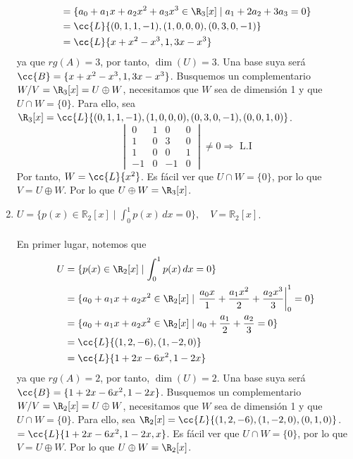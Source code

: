 \begin{ejercicio}
\begin{enumerate}[label=\alph*)]
\begin{align*}
            &= \{ a_0 + a_1 x + a_2 x^2 + a_3 x^3 \in \R_3[x] \mid a_1 + 2a_2 + 3a_3 = 0 \} \\
            &= \cc{L} \{ (0, 1, 1, -1), (1, 0, 0, 0), (0, 3,0, -1) \} \\
            &= \cc{L} \{ x + x^2 - x^3, 1, 3x - x^3 \} 
        \end{align*}
        ya que $rg(A) = 3$, por tanto, $\dim(U) = 3$. Una base suya será $\cc{B} = \{ x + x^2 - x^3, 1, 3x - x^3 \}$.
        Busquemos un complementario $W / V = \R_3[x] = U \oplus W$, necesitamos que $W$ sea de dimensión 1 y que $U \cap W = \{0\}$.
        Para ello, sea $\R_3[x] = \cc{L}\{ (0,1,1,-1), (1,0,0,0), (0,3,0,-1), (0,0,1,0) \}$.
        \begin{equation*}
            \begin{vmatrix}
                0 & 1 & 0 & 0 \\
                1 & 0 & 3 & 0 \\
                1 & 0 & 0 & 1 \\
                -1 & 0 & -1 & 0
            \end{vmatrix} \neq 0 \Rightarrow \text{ L.I}
        \end{equation*}
        Por tanto, $W = \cc{L}\{x^2\}$. Es fácil ver que $U \cap W = \{0\}$, por lo que $V = U \oplus W$. Por lo que $U \oplus W = \R_3[x]$.
        \item \( U = \{ p(x) \in \mathbb{R}_2[x] \mid \int_{0}^{1} p(x) \, dx = 0 \}, \quad V = \mathbb{R}_2[x] \).
        \\ \\ En primer lugar, notemos que 
        \begin{align*}
            U &= \{ p(x) \in \R_2[x] \mid \int_{0}^{1} p(x) \, dx = 0 \} \\
            &= \{ a_0 + a_1 x + a_2 x^2 \in \R_2[x] \mid \left. \frac{a_0 x}{1} + \frac{a_1 x^2}{2} + \frac{a_2 x^3}{3} \right|_0^1 = 0 \} \\
            &= \{ a_0 + a_1 x + a_2 x^2 \in \R_2[x] \mid a_0 + \frac{a_1}{2} + \frac{a_2}{3} = 0 \} \\
            &= \cc{L} \{ (1, 2, -6), (1, -2, 0) \} \\
            &= \cc{L} \{ 1 + 2x - 6x^2, 1 - 2x \}
        \end{align*}
        ya que $rg(A) = 2$, por tanto, $\dim(U) = 2$. Una base suya será $\cc{B} = \{ 1 + 2x - 6x^2, 1 - 2x \}$.
        Busquemos un complementario $W / V = \R_2[x] = U \oplus W$, necesitamos que $W$ sea de dimensión 1 y que $U \cap W = \{0\}$.
        Para ello, sea $\R_2[x] = \cc{L}\{ (1,2,-6), (1,-2,0), (0,1,0) \}$.
        $ = \cc{L}\{ 1 + 2x - 6x^2, 1 - 2x, x \}$. Es fácil ver que $U \cap W = \{0\}$, por lo que $V = U \oplus W$. Por lo que $U \oplus W = \R_2[x]$.
	\end{enumerate}
\end{ejercicio}




